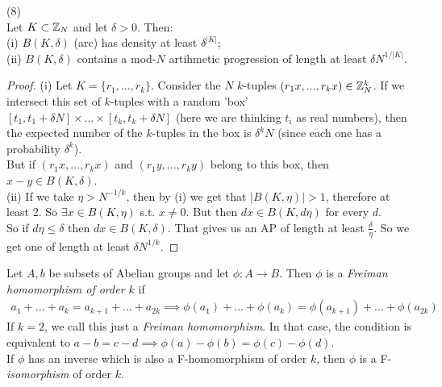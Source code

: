 \documentclass[a4paper]{article}
\begin{document}
\begin{lemma} (8)\\
    Let $K \subset \mathbb{Z}_N$ and let $\delta > 0$. Then:\\
    (i) $B(K,\delta)$ (arc) has density at least $\delta^{|K|}$;\\
    (ii) $B(K,\delta)$ contains a mod-$N$ artihmetic progression of length at least $\delta N^{1/|K|}$.
    \begin{proof}
        (i) Let $K = \{r_1,...,r_k\}$. Consider the $N$ $k$-tuples $(r_1x,...,r_kx) \in \mathbb{Z}_N^k$. If we intersect this set of $k$-tuples with a random 'box' $[t_1,t_1+\delta N] \times ... \times [t_k,t_k+\delta N]$ (here we are thinking $t_i$ as real numbers), then the expected number of the $k$-tuples in the box is $\delta^k N$ (since each one has a probability $\delta^k$).\\
        But if $(r_1x,...,r_kx)$ and $(r_1y,...,r_ky)$ belong to this box, then $x-y \in B(K,\delta)$.\\
        (ii) If we take $\eta > N^{-1/k}$, then by (i) we get that $|B(K,\eta)| > 1$, therefore at least 2. So $\exists x \in B(K,\eta)$ s.t. $x \neq 0$. But then $dx\in B(K,d\eta)$ for every $d$.\\
        So if $d\eta \leq \delta$ then $dx \in B(K,\delta)$. That gives us an AP of length at least $\frac{\delta}{\eta}$. So we get one of length at least $\delta N^{1/k}$.
    \end{proof}
\end{lemma}

\begin{defi}
    Let $A,b$ be subsets of Abelian groups and let $\phi:A \to B$. Then $\phi$ is a \emph{Freiman homomorphism of order $k$} if 
    \begin{equation*}
        \begin{aligned}
            a_1+...+a_k=a_{k+1}+...+a_{2k} \implies \phi(a_1)+...+\phi(a_k) = \phi(a_{k+1})+...+\phi(a_{2k})
        \end{aligned}
    \end{equation*}
    If $k=2$, we call this just a \emph{Freiman homomorphism}. In that case, the condition is equivalent to $a-b=c-d \implies \phi(a)-\phi(b)=\phi(c)-\phi(d)$.\\
    If $\phi$ has an inverse which is also a F-homomorphism of order $k$, then $\phi$ is a F-\emph{isomorphism} of order $k$.
\end{defi}
\end{document}
